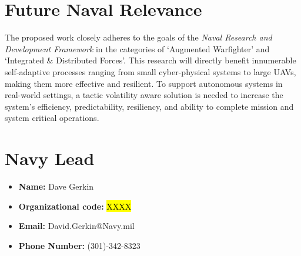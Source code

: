 \documentclass[12pt]{article}
\newcommand{\dan}[1]{\textcolor{blue}{{\it [Dan: #1]}}}
\begin{document}


 




\section{Future Naval Relevance}


The proposed work closely adheres to the goals of the \emph{Naval Research and Development Framework} in the categories of `Augmented Warfighter' and `Integrated \& Distributed Forces'. This research will directly benefit innumerable self-adaptive processes ranging from small cyber-physical systems to large UAVs, making them more effective and resilient. To support autonomous systems in real-world settings, a tactic volatility aware solution is needed to increase the system's efficiency, predictability, resiliency, and ability to complete mission and system critical operations. 


\section{Navy Lead}





    \begin{multicols}{2}
    \begin{itemize}[noitemsep]
        \item \textbf{Name: }Dave Gerkin 
        \item \textbf{Organizational code: }\hl{XXXX}   %
        \item \textbf{Email: }David.Gerkin@Navy.mil
        \item \textbf{Phone Number: }(301)-342-8323

    \end{itemize}
    \end{multicols}
\end{document}
